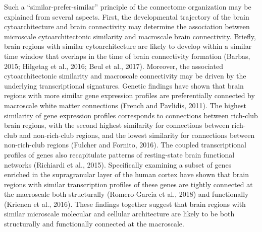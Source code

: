 \begin{refsection}
Such a “similar-prefer-similar” principle of the connectome organization may be explained from several aspects. First, the developmental trajectory of the brain cytoarchitecture and brain connectivity may determine the association between microscale cytoarchitectonic similarity and macroscale brain connectivity. Briefly, brain regions with similar cytoarchitecture are likely to develop within a similar time window that overlaps in the time of brain connectivity formation (Barbas, 2015; Hilgetag et al., 2016; Beul et al., 2017). Moreover, the associated cytoarchitectonic similarity and macroscale connectivity may be driven by the underlying transcriptional signatures. Genetic findings have shown that brain regions with more similar gene expression profiles are preferentially connected by macroscale white matter connections (French and Pavlidis, 2011). The highest similarity of gene expression profiles corresponds to connections between rich-club brain regions, with the second highest similarity for connections between rich-club and non-rich-club regions, and the lowest similarity for connections between non-rich-club regions (Fulcher and Fornito, 2016). The coupled transcriptional profiles of genes also recapitulate patterns of resting-state brain functional networks (Richiardi et al., 2015). Specifically examining a subset of genes enriched in the supragranular layer of the human cortex have shown that brain regions with similar transcription profiles of these genes are tightly connected at the macroscale both structurally (Romero-Garcia et al., 2018) and functionally (Krienen et al., 2016). These findings together suggest that brain regions with similar microscale molecular and cellular architecture are likely to be both structurally and functionally connected at the macroscale.


\end{refsection}
